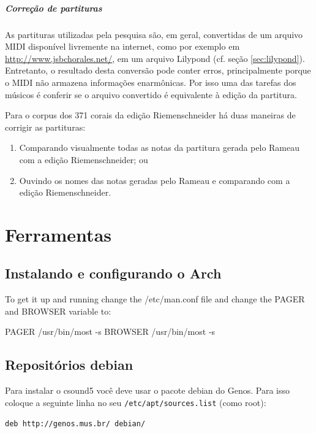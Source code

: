 \documentclass[12pt,brazil]{book}
\begin{document}
\subsubsection{Correção de partituras}
\label{sec:corr-de-part}

As partituras utilizadas pela pesquisa são, em geral, convertidas de
um arquivo MIDI disponível livremente na internet, como por exemplo em
\url{http://www.jsbchorales.net/}, em um arquivo Lilypond (cf. seção
\ref{sec:lilypond}). Entretanto, o resultado desta conversão pode
conter erros, principalmente porque o MIDI não armazena informações
enarmônicas. Por isso uma das tarefas dos músicos é conferir se o
arquivo convertido é equivalente à edição da partitura.

Para o corpus dos 371 corais da edição Riemenschneider há duas
maneiras de corrigir as partituras:
\begin{enumerate}
\item Comparando visualmente todas as notas da partitura gerada pelo
  Rameau com a edição Riemenschneider; ou
\item Ouvindo os nomes das notas geradas pelo Rameau e comparando com
  a edição Riemenschneider.
\end{enumerate}

\part{Ferramentas}
\label{part:ferramentas}

\chapter{Instalando e configurando o Arch}
\label{cha:inst-e-conf}

To get it up and running change the /etc/man.conf file and change the PAGER and BROWSER variable to:

PAGER           /usr/bin/most -s
BROWSER         /usr/bin/most -s

\chapter{Repositórios debian}
\label{cha:repositorios-debian}

Para instalar o csound5 você deve usar o pacote debian do Genos. Para
isso coloque a seguinte linha no seu \texttt{/etc/apt/sources.list}
(como root):

\begin{verbatim}
deb http://genos.mus.br/ debian/
\end{verbatim}
\end{document}
